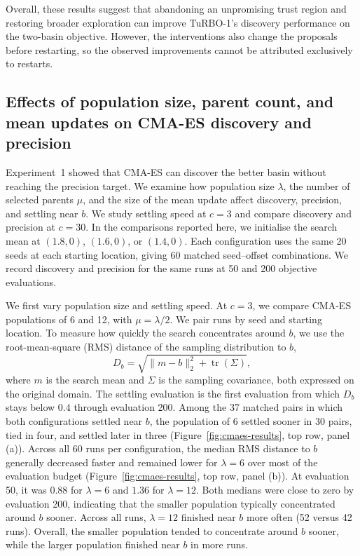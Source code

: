 Overall, these results suggest that abandoning an unpromising trust region and restoring broader exploration can improve TuRBO-1's discovery performance on the two-basin objective. However, the interventions also change the proposals before restarting, so the observed improvements cannot be attributed exclusively to restarts.

\subsection{Effects of population size, parent count, and mean updates
on CMA-ES discovery and precision}

Experiment~1 showed that CMA-ES can discover the better basin without
reaching the precision target. We examine how population size
\(\lambda\), the number of selected parents \(\mu\), and the size of
the mean update affect discovery, precision, and settling near \(b\).
We study settling speed at \(c=3\) and compare discovery and precision
at \(c=30\). In the comparisons reported here, we initialise the search
mean at \((1.8,0)\), \((1.6,0)\), or \((1.4,0)\).
Each configuration uses the same 20 seeds at each starting location,
giving 60 matched seed--offset combinations. We record discovery and
precision for the same runs at 50 and 200 objective evaluations.

We first vary population size and settling speed.
At \(c=3\), we compare CMA-ES populations of 6 and 12, with
\(\mu=\lambda/2\). We pair runs by seed and starting location.
To measure how quickly the search concentrates around \(b\), we use
the root-mean-square (RMS) distance of the sampling distribution to \(b\),
\[
D_b=\sqrt{\|m-b\|_2^2+\operatorname{tr}(\Sigma)},
\]
where \(m\) is the search mean and \(\Sigma\) is the sampling covariance,
both expressed on the original domain. The settling evaluation is the
first evaluation from which \(D_b\) stays below \(0.4\) through
evaluation 200. Among the 37 matched pairs in which both configurations
settled near \(b\), the population of 6 settled sooner in 30 pairs,
tied in four, and settled later in three
(Figure~\ref{fig:cmaes-results}, top row, panel (a)).
Across all 60 runs per configuration, the median RMS distance to \(b\)
generally decreased faster and remained lower for \(\lambda=6\) over
most of the evaluation budget
(Figure~\ref{fig:cmaes-results}, top row, panel (b)).
At evaluation 50, it was \(0.88\) for
\(\lambda=6\) and \(1.36\) for \(\lambda=12\). Both medians were close
to zero by evaluation 200, indicating that the smaller population
typically concentrated around \(b\) sooner. Across all runs,
\(\lambda=12\) finished near \(b\) more often (52 versus 42 runs).
Overall, the smaller population tended to concentrate around \(b\)
sooner, while the larger population finished near \(b\) in more runs.

